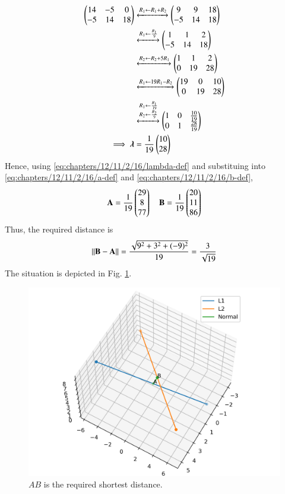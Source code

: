 \documentclass[journal,12pt,twocolumn]{IEEEtran}
\renewcommand{\vec}[1]{\boldsymbol{\mathbf{#1}}}
\begin{document}
    \begin{align}
        \myvec{14&-5&0\\-5&14&18} &\xleftrightarrow[]{R_1\leftarrow R_1+R_2} \myvec{9&9&18\\-5&14&18} \\
                 &\xleftrightarrow[]{R_1\leftarrow\frac{R_1}{9}} \myvec{1&1&2\\-5&14&18} \\
                 &\xleftrightarrow[]{R_2\leftarrow R_2+5R_1} \myvec{1&1&2\\0&19&28} \\
                 &\xleftrightarrow[]{R_1\leftarrow19R_1-R_2} \myvec{19&0&10\\0&19&28} \\
                 &\xleftrightarrow[]{\substack{R_1\leftarrow\frac{R_1}{19}\\R_2\leftarrow\frac{R_2}{9}}}
                    \myvec{1&0&\frac{10}{19}\\0&1&\frac{28}{19}} \\
                    \implies \vec{\lambda} &= \frac{1}{19}\myvec{10\\28}
        \label{eq:chapters/12/11/2/16/lambda-sol}
    \end{align}
    Hence, using \eqref{eq:chapters/12/11/2/16/lambda-def} and substituing into \eqref{eq:chapters/12/11/2/16/a-def} and \eqref{eq:chapters/12/11/2/16/b-def},
    \begin{align}
        \vec{A} = \frac{1}{19}\myvec{29\\8\\77} \quad \vec{B} = \frac{1}{19}\myvec{20\\11\\86}
    \end{align}
    Thus, the required distance is
    \begin{align}
        \norm{\vec{B}-\vec{A}} = \frac{\sqrt{9^2 +3^2 +(-9)^2}}{19} = \frac{3}{\sqrt{19}}
    \end{align}
    The situation is depicted in Fig. \ref{fig:chapters/12/11/2/16/skew}.

    \begin{figure}[!ht]
        \centering
        \includegraphics[width=\columnwidth]{chapters/12/11/2/16/figs/skew.png}
        \caption{$AB$ is the required shortest distance.}
        \label{fig:chapters/12/11/2/16/skew}
    \end{figure}
\end{document}
